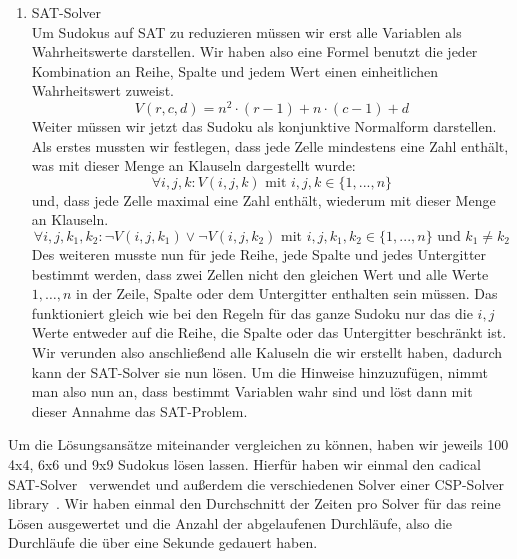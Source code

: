 \begin{enumerate}
    \item SAT-Solver \\
    Um Sudokus auf SAT zu reduzieren müssen wir erst alle Variablen als Wahrheitswerte darstellen. Wir haben also eine Formel benutzt die jeder Kombination an Reihe, Spalte und jedem Wert einen einheitlichen Wahrheitswert zuweist.
    \begin{equation}
        V(r, c, d) = n^2 \cdot (r - 1) + n \cdot (c - 1) + d
    \end{equation}
    Weiter müssen wir jetzt das Sudoku als konjunktive Normalform darstellen.
    Als erstes mussten wir festlegen, dass jede Zelle mindestens eine Zahl enthält, was mit dieser Menge an Klauseln dargestellt wurde:
    \begin{equation}
        \forall i, j, k: V(i, j, k) \text{ mit } i, j, k \in \{1, ..., n\} %
    \end{equation}
    und, dass jede Zelle maximal eine Zahl enthält, wiederum mit dieser Menge an Klauseln.
    \begin{equation}
        \forall i, j, k_1, k_2: \neg V(i, j, k_1) \vee \neg V(i, j, k_2) \text{ mit }i, j, k_1, k_2 \in \{1, ..., n\} \text{ und } k_1 \neq k_2 %
    \end{equation}
    Des weiteren musste nun für jede Reihe, jede Spalte und jedes Untergitter bestimmt werden, dass zwei Zellen nicht den gleichen Wert und alle Werte $1, \dots, n$ %
    in der Zeile, Spalte oder dem Untergitter enthalten sein müssen.
    Das funktioniert gleich wie bei den Regeln für das ganze Sudoku nur das die $i, j$ Werte entweder auf die Reihe, die Spalte oder das Untergitter beschränkt ist.
    Wir verunden also anschließend alle Kaluseln die wir erstellt haben, dadurch kann der SAT-Solver sie nun lösen.
    Um die Hinweise hinzuzufügen, nimmt man also nun an, dass bestimmt Variablen wahr sind und löst dann mit dieser Annahme das SAT-Problem.
\end{enumerate}

Um die Lösungsansätze miteinander vergleichen zu können, haben wir jeweils 100 4x4, 6x6 und 9x9 Sudokus lösen lassen.
Hierfür haben wir einmal den cadical SAT-Solver~\cite{pysat} verwendet und außerdem die verschiedenen Solver einer CSP-Solver library~\cite{pycsp}.
Wir haben einmal den Durchschnitt der Zeiten pro Solver für das reine Lösen ausgewertet und die Anzahl der abgelaufenen Durchläufe, also die Durchläufe die über eine Sekunde gedauert haben.

